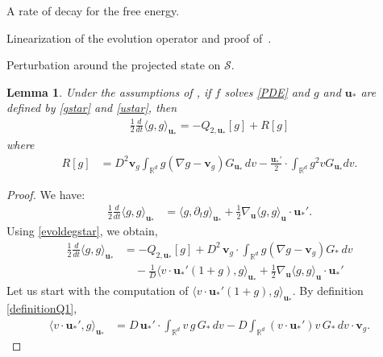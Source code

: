 \documentclass[reqno]{amsart} %
\newtheorem{lemma}{Lemma}[section]
\begin{document}
\begin{section}{A rate of decay for the free energy.}
\begin{section}{Linearization of the evolution operator and proof of~\texorpdfstring{}{thm3}.}
\begin{subsection}{Perturbation around the projected state on \texorpdfstring{$\mathcal{S}$}{S}.}
 \begin{lemma}
\label{deriveps}
 Under the assumptions of , if $f$ solves \eqref{PDE} and $g$ and $\mathbf{u}_*$ are defined by \eqref{gstar} and \eqref{ustar}, then 
    \begin{align}
        \frac{1}{2}\frac{d}{dt}\langle g,g\rangle _{\mathbf{u}_*}= -Q_{2,\mathbf{u}_*}[g]+ R[g]
    \end{align}
where 
\begin{align}
\label{expressiondeR}
    R[g]&=D^2 \mathbf{v}_g  \int_{\mathbb{R}^d}g(\nabla g- \mathbf{v}_g)G_{\mathbf{u}_*}\, dv -\frac{\mathbf{u}_*'}{2}\cdot \int_{\mathbb{R}^d}g^2vG_{\mathbf{u}_*}dv.
\end{align}
\end{lemma}
\begin{proof}
We have:
\begin{equation*}
\begin{split}
    \frac{1}{2}\frac{d}{dt}\langle g, g \rangle_{\mathbf{u}_*}
    &= \langle g, \partial_t g \rangle_{\mathbf{u}_*}
    + \frac{1}{2} \nabla_\mathbf{u} \langle g, g \rangle_\mathbf{u} \cdot \mathbf{u}_*'.
\end{split}
\end{equation*}
Using \eqref{evoldegstar}, we obtain,
\begin{equation}
\label{bigequa}
\begin{split}
    \frac{1}{2} \frac{d}{dt} \langle g, g \rangle_{\mathbf{u}_*}
    &= -Q_{2,\mathbf{u}_*}[g] 
    + D^2\, \mathbf{v}_g \cdot \int_{\mathbb{R}^d} g(\nabla g - \mathbf{v}_g) G_*\,dv \\
    &\quad - \frac{1}{D} \langle v \cdot \mathbf{u}_*'(1+g), g \rangle_{\mathbf{u}_*}
    + \frac{1}{2} \nabla_\mathbf{u} \langle g, g \rangle_\mathbf{u} \cdot \mathbf{u}_*'
\end{split}
\end{equation}
Let us start with the computation of $\langle v\cdot \mathbf{u}_*'(1+g),g\rangle_{\mathbf{u}_*}$.
By definition \eqref{definitionQ1},  
\begin{align*}
    \langle v\cdot \mathbf{u}_*',g\rangle_{\mathbf{u}_*}&=D\, \mathbf{u}_*'\cdot \int_{\mathbb{R}^d} v \, g\,G_{*}\,dv- D\int_{\mathbb{R}^d}(v\cdot \mathbf{u}_*') v  \,G_{*}\,dv \cdot \mathbf{v}_g.
\end{align*}

\end{proof}
\end{subsection}
\end{section}
\end{section}
\end{document}
